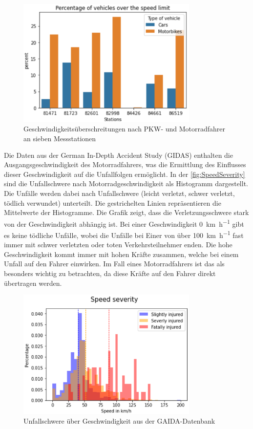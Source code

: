 \begin{figure}
	\centering
	\includegraphics[width=0.8\textwidth]{Bilder/GeschwUberschreitungPksMotorrad.png}
	\caption{Geschwindigkeitsüberschreitungen nach PKW- und Motorradfahrer an sieben Messstationen\citep{Maire2020}}
	\label{fig:GeschwUberschreitungPksMotorrad}
\end{figure}
Die Daten aus der German In-Depth Accident Study (GIDAS) enthalten die Ausgangsgeschwindigkeit des Motorradfahrers, was die Ermittlung des Einflusses dieser Geschwindigkeit auf die Unfallfolgen ermöglicht. In der \autoref{fig:SpeedSeverity} sind die Unfallschwere nach Motorradgeschwindigkeit als Histogramm dargestellt. Die Unfälle werden dabei nach Unfallschwere (leicht verletzt, schwer verletzt, tödlich verwundet) unterteilt. Die gestrichelten Linien repräsentieren die Mittelwerte der Histogramme.
Die Grafik zeigt, dass die Verletzungsschwere stark von der Geschwindigkeit abhängig ist. Bei einer Geschwindigkeit \SI[per-mode = symbol]{0}{\kilo\meter\per\hour} gibt es keine tödliche Unfälle, wobei die Unfälle bei Einer von über \SI[per-mode = symbol]{100}{\kilo\meter\per\hour} fast immer mit schwer verletzten oder toten Verkehrsteilnehmer enden. Die hohe Geschwindigkeit kommt immer mit hohen Kräfte zusammen, welche bei einem Unfall auf den Fahrer einwirken. Im Fall eines Motorradfahrers ist das als besonders wichtig zu betrachten, da diese Kräfte auf den Fahrer direkt übertragen werden. \citep{Maire2020}


\begin{figure}
	\centering
	\includegraphics[width=0.8\textwidth]{Bilder/SpeedSeverity.png}
	\caption{Unfallschwere über Geschwindigkeit aus der GAIDA-Datenbank\citep{Maire2020}}
	\label{fig:SpeedSeverity}
\end{figure}

